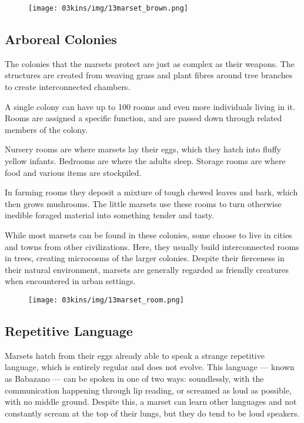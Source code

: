 \begin{figure}[!b]
    \centering
    \texttt{[image: 03kins/img/13marset\_brown.png]}
\end{figure}

\subsection*{Arboreal Colonies}
The colonies that the marsets protect are just as complex as their weapons.
The structures are created from weaving grass and plant fibres around tree branches to create interconnected chambers.

A single colony can have up to 100 rooms and even more individuals living in it.
Rooms are assigned a specific function, and are passed down through related members of the colony.

Nursery rooms are where marsets lay their eggs, which they hatch into fluffy yellow infants.
Bedrooms are where the adults sleep.
Storage rooms are where food and various items are stockpiled.

In farming rooms they deposit a mixture of tough chewed leaves and bark, which then grows mushrooms.
The little marsets use these rooms to turn otherwise inedible foraged material into something tender and tasty.

While most marsets can be found in these colonies, some choose to live in cities and towns from other civilizations.
Here, they usually build interconnected rooms in trees, creating microcosms of the larger colonies.
Despite their fierceness in their natural environment, marsets are generally regarded as friendly creatures when encountered in urban settings.

\begin{figure}[!t]
    \centering
    \texttt{[image: 03kins/img/13marset\_room.png]}
\end{figure}

\subsection*{Repetitive Language}
Marsets hatch from their eggs already able to speak a strange repetitive language, which is entirely regular and does not evolve.
This language --- known as Babazano --- can be spoken in one of two ways: soundlessly, with the communication happening through lip reading, or screamed as loud as possible, with no middle ground.
Despite this, a marset can learn other languages and not constantly scream at the top of their lungs, but they do tend to be loud speakers.

